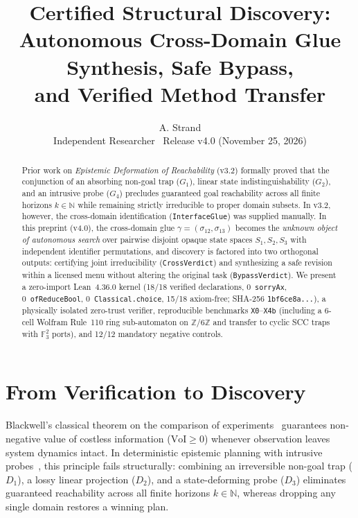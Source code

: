 \documentclass[10pt,a4paper]{article}
\title{\textbf{\Large Certified Structural Discovery:}\\[4pt]
\large Autonomous Cross-Domain Glue Synthesis, Safe Bypass,\\
and Verified Method Transfer}
\author{A. Strand\\
\small Independent Researcher \textperiodcentered\ Release v4.0 (November 25, 2026)}
\date{}
\newcommand{\code}[1]{\nolinkurl{#1}}
\begin{document}
\maketitle

\begin{abstract}
Prior work on \emph{Epistemic Deformation of Reachability} (v3.2) formally proved that the conjunction of an absorbing non-goal trap ($G_1$), linear state indistinguishability ($G_2$), and an intrusive probe ($G_4$) precludes guaranteed goal reachability across all finite horizons $k \in \mathbb{N}$ while remaining strictly irreducible to proper domain subsets. In v3.2, however, the cross-domain identification (\code{InterfaceGlue}) was supplied manually. In this preprint (v4.0), the cross-domain glue $\gamma = (\sigma_{12}, \sigma_{13})$ becomes the \emph{unknown object of autonomous search} over pairwise disjoint opaque state spaces $S_1, S_2, S_3$ with independent identifier permutations, and discovery is factored into two orthogonal outputs: certifying joint irreducibility (\code{CrossVerdict}) and synthesizing a safe revision within a licensed menu without altering the original task (\code{BypassVerdict}). We present a zero-import Lean~4.36.0 kernel (18/18 verified declarations, 0~\code{sorryAx}, 0~\code{ofReduceBool}, 0~\code{Classical.choice}, 15/18 axiom-free; SHA-256 \code{1bf6ce8a...}), a physically isolated zero-trust verifier, reproducible benchmarks \texttt{X0}--\texttt{X4b} (including a 6-cell Wolfram Rule~110 ring sub-automaton on $\mathbb{Z}/6\mathbb{Z}$ and transfer to cyclic SCC traps with $\mathbb{F}_3^2$ ports), and 12/12 mandatory negative controls.
\end{abstract}

\section{From Verification to Discovery}

Blackwell's classical theorem on the comparison of experiments~\cite{blackwell1953,howard1966} guarantees non-negative value of costless information ($\mathrm{VoI} \ge 0$) whenever observation leaves system dynamics intact. In deterministic epistemic planning with intrusive probes~\cite{fagin1995,vanditmarsch2007,kaelbling1998,strand2026v32}, this principle fails structurally: combining an irreversible non-goal trap ($D_1$), a lossy linear projection ($D_2$), and a state-deforming probe ($D_3$) eliminates guaranteed reachability across all finite horizons $k \in \mathbb{N}$, whereas dropping any single domain restores a winning plan.
\end{document}
